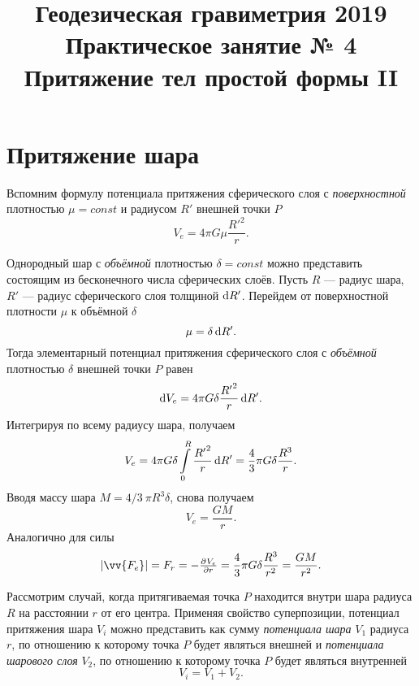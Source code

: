 \documentclass[11pt, a4paper]{article}
\title{{\Large Геодезическая гравиметрия 2019}\\ 
    {\bf\Large Практическое занятие № 4} \\
{\Large Притяжение тел простой формы II}}
\author{}
\date{\DTMusedate{lessondate}}
\theoremstyle{plain}
\theoremstyle{definition}
\theoremstyle{remark}
\begin{document}
\maketitle

\section{Притяжение шара}
Вспомним формулу потенциала притяжения сферического слоя с \textit{поверхностной} плотностью $\mu=const$ и радиусом $R'$ внешней точки $P$
\begin{equation*}
    V_e = 4\pi G\mu\dfrac{{R'}^2}{r}.
\end{equation*}

Однородный шар с \textit{объёмной} плотностью $\delta=const$ можно представить состоящим из бесконечного числа
сферических слоёв. Пусть $R$ --- радиус шара,
$R'$ --- радиус сферического слоя толщиной $\dif R'$. Перейдем от поверхностной плотности $\mu$ к объёмной $\delta$
 \begin{equation*}
    \mu = \delta \dif R'.
\end{equation*}
Тогда элементарный потенциал притяжения сферического слоя с \textit{объёмной} плотностью $\delta$ внешней точки $P$ равен
\begin{equation*}
    \dif V_e = 4\pi G\delta\dfrac{{R'}^2}{r}\dif R'.
\end{equation*}
Интегрируя по всему радиусу шара, получаем
\begin{equation*}
    V_e = 4\pi G\delta \int\limits_{0}^{R}\dfrac{{R'}^2}{r}\dif R' = 
    \dfrac{4}{3}\pi G\delta\dfrac{R^3}{r}.
\end{equation*}
Вводя массу шара $M = 4/3\ \pi R^3 \delta$, снова получаем
\begin{equation*}
    V_e = \dfrac{GM}{r}.
\end{equation*}
Аналогично для силы
\begin{equation*}
    |\vv{F_e}| = F_r = -\pd{V_e}{r} = \dfrac{4}{3}\pi G\delta \dfrac{R^3}{r^2} = 
    \dfrac{GM}{r^2}.
\end{equation*}

Рассмотрим случай, когда притягиваемая точка $P$ находится внутри шара радиуса $R$ на расстоянии $r$ от его центра. Применяя свойство суперпозиции, потенциал притяжения шара $V_i$ можно представить как сумму \textit{потенциала шара} $V_1$ радиуса $r$, по отношению к которому точка $P$ будет являться внешней и \textit{потенциала шарового слоя} $V_2$, по отношению к которому точка $P$ будет являться внутренней
\begin{equation*}
    V_i = V_1 + V_2.
\end{equation*}
\end{document}
